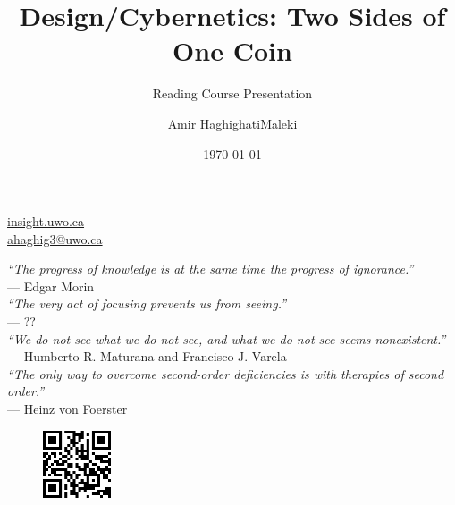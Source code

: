 \documentclass[
	11pt,
	aspectratio=169,
]{beamer}
\begin{document}
	\author{Amir HaghighatiMaleki}
	\title{Design/Cybernetics: Two Sides of One Coin}
	\subtitle{Reading Course Presentation}
	\date{\today}
	\subject{Reading Course Presentation}
	\begin{frame}
		\maketitle
		\centering\tiny\hyperlink{http://insight.uwo.ca}{insight.uwo.ca}\\
		\centering\tiny\hyperlink{mailto:ahaghig3@uwo.ca}{ahaghig3@uwo.ca}
	\end{frame}

    \begin{frame}
    	\textit{\rm``The progress of knowledge is at the same time the progress of ignorance.''}\\
    	--- Edgar Morin \cite{morin_1992} \\
    	\vspace{0.4cm}
    	\textit{\rm``The very act of focusing prevents us from seeing.''}\\
    	--- ?? \\
    	\vspace{0.4cm}
    	\textit{\rm``We do not see what we do not see, and what we do not see seems nonexistent.''}\\
    	--- Humberto R. Maturana and Francisco J. Varela \cite{maturana_varela_1987}\\
    	\vspace{0.4cm}
    	\textit{\rm``The only way to overcome second-order deficiencies is with therapies of second order.''}\\
    	--- Heinz von Foerster \cite{vonFoerster_2003}\\
    	\vspace{0.4cm}
    	\begin{figure}
    		\centering
    		\href{https://anewage.github.io}{
    			\includegraphics[width=2cm]{resources/anewage_github_io.png}
    		}
    	\end{figure}
    \end{frame}
\end{document}
